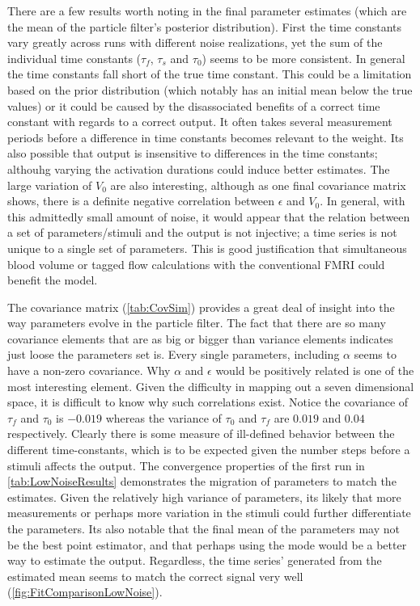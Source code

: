 There are a few results worth noting in the final parameter estimates (which 
are the mean of the particle filter's posterior distribution). First the time constants vary 
greatly across
runs with different noise realizations, yet the sum of the individual time constants
($\tau_f$, $\tau_s$ and $\tau_0$) seems to be more consistent. In general the 
time constants fall short of the true time constant. This could be a limitation
based on the prior distribution (which notably has an initial mean below the true values) 
or it could be caused by the disassociated benefits of a correct time
constant with regards to a correct output. It often takes several measurement periods before 
a difference
in time constants becomes relevant to the weight. Its also possible that output is insensitive
to differences in the time constants; althouhg varying the activation durations could induce
better estimates.  The large variation of $V_0$ are also interesting, although as one final
covariance matrix shows, there is a definite negative correlation between $\epsilon$ and $V_0$.
In general,
with this admittedly small amount of noise, it would appear that the relation between a set
of parameters/stimuli and the output is not injective; a time
series is not unique to a single set of parameters. This is good justification that 
simultaneous blood volume or tagged flow calculations with the conventional FMRI 
could benefit the model. 

The covariance matrix (\autoref{tab:CovSim}) provides a great deal of insight into 
the way parameters evolve in the particle filter. The fact that there are so many 
covariance elements that are as big or bigger than variance elements indicates just
loose the parameters set is. Every single parameters, including $\alpha$ seems to
have a non-zero covariance. Why $\alpha$ and $\epsilon$ would be positively related
is one of the most interesting element. Given the difficulty in mapping out a 
seven dimensional space, it is difficult to know why such correlations exist. 
 Notice the covariance of $\tau_f$ and $\tau_0$
is $-0.019$ whereas
the variance of $\tau_0$ and $\tau_f$ are $0.019$ and $0.04$ respectively. Clearly there is 
some measure of ill-defined behavior between the different time-constants, which is to
be expected given the number steps before a stimuli affects the output. 
The convergence properties of the first run in \autoref{tab:LowNoiseResults} 
demonstrates the migration of parameters to match the estimates. Given the relatively high
variance of parameters, its likely that more measurements or perhaps more variation
in the stimuli could further differentiate the parameters. Its also notable that
the final mean of the parameters may not be the best point estimator, and that perhaps
using the mode would be a better way to estimate the output. Regardless, the time series'
generated from the estimated mean seems to match the correct signal very well 
(\autoref{fig:FitComparisonLowNoise}).

